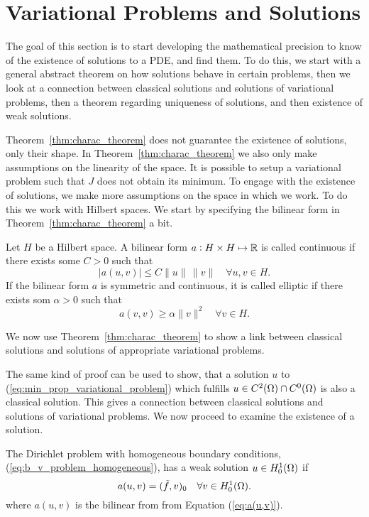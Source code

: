 \section{Variational Problems and Solutions}
The goal of this section is to start developing the mathematical 
precision to know of the existence of solutions to a PDE, and find 
them. 
To do this, we start with a general abstract theorem on how solutions 
behave in certain problems, then we look at a connection between 
classical solutions and solutions of variational problems, then a 
theorem regarding uniqueness of solutions, and then existence of 
weak solutions.


Theorem~\ref{thm:charac_theorem} does not guarantee the existence 
of solutions, only their shape. In Theorem~\ref{thm:charac_theorem} we 
also only make assumptions on the linearity of the space. 
It is possible to setup a variational problem such that $J$ does 
not obtain its minimum.
To engage with the existence of solutions, we make more assumptions on 
the space in which we work. To do this we work with Hilbert spaces. 
We start by specifying the bilinear form in Theorem~\ref{thm:charac_theorem} 
a bit.
\begin{defn}{\quad}
   Let $H$ be a Hilbert space. A bilinear form $a : H \times H \mapsto \mathbb{R}$ is 
   called continuous if there exists some $C > 0$ such that 
   \begin{equation}
    |a(u,v)| \leq C \|u\|\, \|v\| \quad \forall u,v \in H.
   \end{equation} 
   If the bilinear form $a$ is symmetric and continuous, it is called 
   elliptic if there exists som $\alpha >0$ such that 
   \begin{equation*}
    a(v,v) \geq \alpha \|v\|^2 \quad \forall v \in H.
   \end{equation*}
\end{defn}
We now use Theorem~\ref{thm:charac_theorem} to show a link between classical 
solutions and solutions of appropriate variational problems.

The same kind of proof can be used to show, that a solution $u$ to 
(\ref{eq:min_prop_variational_problem}) which fulfills 
$u\in C^2(\Omega) \cap C^0(\Omega)$ is also a classical solution. 
This gives a connection between classical solutions and solutions of 
variational problems. We now proceed to examine the existence of a 
solution.


\begin{defn}{\quad}
    The Dirichlet problem with homogeneous boundary conditions,
     (\ref{eq:b_v_problem_homogeneous}), has a weak solution $u\in H_0^1(\Omega)$
     if 
     \begin{equation*}
        a(u,v) = (\tilde{f},v)_0 \quad \forall v \in H_0^1(\Omega).
     \end{equation*}
     where $a(u,v)$ is the bilinear from from Equation (\ref{eq:a(u,v)}).
\end{defn}

